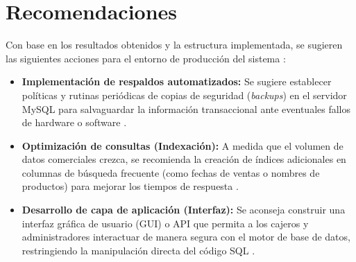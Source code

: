 \chapter{Recomendaciones}

Con base en los resultados obtenidos y la estructura implementada, se sugieren las siguientes acciones para el entorno de producción del sistema \supercite{elmasri2015fundamentals}:

\begin{itemize}
    \item \textbf{Implementación de respaldos automatizados:} Se sugiere establecer políticas y rutinas periódicas de copias de seguridad (\textit{backups}) en el servidor MySQL para salvaguardar la información transaccional ante eventuales fallos de hardware o software \supercite{schwartz2012high}.
    \item \textbf{Optimización de consultas (Indexación):} A medida que el volumen de datos comerciales crezca, se recomienda la creación de índices adicionales en columnas de búsqueda frecuente (como fechas de ventas o nombres de productos) para mejorar los tiempos de respuesta \supercite{elmasri2015fundamentals}.
    \item \textbf{Desarrollo de capa de aplicación (Interfaz):} Se aconseja construir una interfaz gráfica de usuario (GUI) o API que permita a los cajeros y administradores interactuar de manera segura con el motor de base de datos, restringiendo la manipulación directa del código SQL \supercite{sommerville2015software}.
\end{itemize}